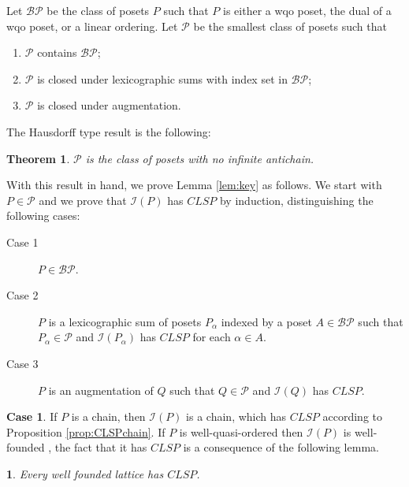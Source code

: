 \documentclass[12pt]{amsart}
\newtheorem{theorem}[definition]{{\bf Theorem}}
\newtheorem{lemma}[definition]{\noindent {\bf Lemma}}
\begin{document}
Let $\mathcal {BP}$ be the class of posets $P$ such that $P$ is either
a wqo poset, the dual of a wqo poset, or a linear ordering.  Let
$\mathcal P$ be the smallest class of posets such that

\begin{enumerate} [{(a)}]
\item $\mathcal P$  contains $\mathcal {BP}$;
 \item $ \mathcal P$ is closed under lexicographic sums with index set in $\mathcal {BP}$;
\item $\mathcal P$  is closed under augmentation.
\end{enumerate}

\noindent
The Hausdorff type result  is the following:\\

\begin{theorem}\label{main-abraham}\cite{abraham-all} 
$\mathcal P$ is the class of posets with no infinite antichain.
\end{theorem}

With this result in hand, we prove Lemma \ref{lem:key} as follows. We
start with $P\in \mathcal P$ and we prove that $\mathcal {I}(P)$ has
$CLSP$ by induction, distinguishing the following cases:

\begin{description}
\item [Case  1]  $P\in \mathcal{BP}$.

\item [Case  2]  $P$ is a lexicographic sum of posets  $P_{\alpha}$  indexed by a poset $A\in\mathcal {BP}$ such 
that $P_{\alpha}\in \mathcal {P}$ and $\mathcal {I}(P_{\alpha})$ has  $CLSP$ for each $\alpha \in A$.

\item [Case 3] $P$ is an augmentation of $Q$ such that $Q\in \mathcal P$ and $\mathcal {I}(Q)$ has  $CLSP$.
\end{description}

\noindent
{\bf Case  1}. If $P$ is a chain, then $\mathcal {I}(P)$ is a chain, which has $CLSP$ according to 
Proposition  \ref{prop:CLSPchain}. If $P$ is well-quasi-ordered  then $\mathcal {I}(P)$ is well-founded 
\cite {higman}, the fact that  it has  $CLSP$  is a consequence of the following lemma.

\begin{lemma}\label {lemma:well-founded} Every well founded lattice has  $CLSP$. 
\end{lemma}
\end{document}
